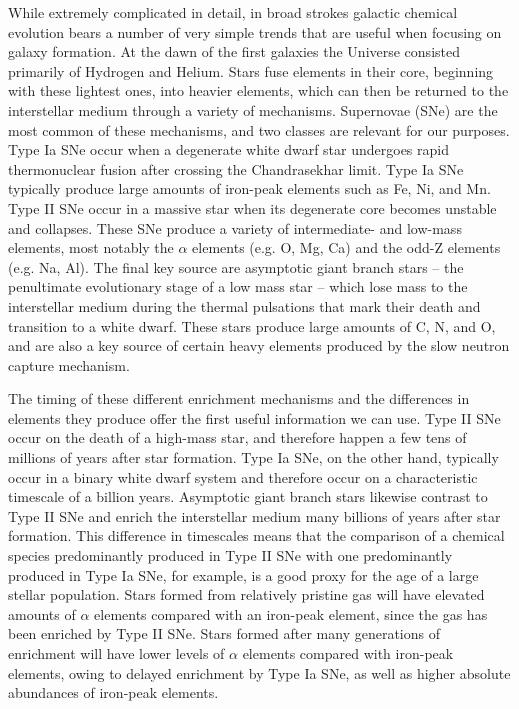While extremely complicated in detail, in broad strokes galactic chemical evolution bears a number of very simple trends that are useful when focusing on galaxy formation. At the dawn of the first galaxies the Universe consisted primarily of Hydrogen and Helium. Stars fuse elements in their core, beginning with these lightest ones, into heavier elements, which can then be returned to the interstellar medium through a variety of mechanisms. Supernovae (SNe) are the most common of these mechanisms, and two classes are relevant for our purposes. Type Ia SNe occur when a degenerate white dwarf star undergoes rapid thermonuclear fusion after crossing the Chandrasekhar limit. Type Ia SNe typically produce large amounts of iron-peak elements such as Fe, Ni, and Mn. Type II SNe occur in a massive star when its degenerate core becomes unstable and collapses. These SNe produce a variety of intermediate- and low-mass elements, most notably the $\alpha$ elements (e.g. O, Mg, Ca) and the odd-Z elements (e.g. Na, Al). The final key source are asymptotic giant branch stars -- the penultimate evolutionary stage of a low mass star -- which lose mass to the interstellar medium during the thermal pulsations that mark their death and transition to a white dwarf. These stars produce large amounts of C, N, and O, and are also a key source of certain heavy elements produced by the slow neutron capture mechanism.

The timing of these different enrichment mechanisms and the differences in elements they produce offer the first useful information we can use. Type II SNe occur on the death of a high-mass star, and therefore happen a few tens of millions of years after star formation. Type Ia SNe, on the other hand, typically occur in a binary white dwarf system and therefore occur on a characteristic timescale of a billion years. Asymptotic giant branch stars likewise contrast to Type II SNe and enrich the interstellar medium many billions of years after star formation. This difference in timescales means that the comparison of a chemical species predominantly produced in Type II SNe with one predominantly produced in Type Ia SNe, for example, is a good proxy for the age of a large stellar population. Stars formed from relatively pristine gas will have elevated amounts of $\alpha$ elements compared with an iron-peak element, since the gas has been enriched by Type II SNe. Stars formed after many generations of enrichment will have lower levels of $\alpha$ elements compared with iron-peak elements, owing to delayed enrichment by Type Ia SNe, as well as higher absolute abundances of iron-peak elements.

